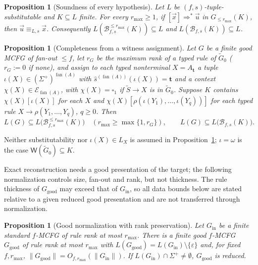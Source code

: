 \documentclass[11pt]{article}
\numberwithin{equation}{section}
\theoremstyle{plain}
\newtheorem{proposition}[theorem]{Proposition}
\theoremstyle{definition}
\theoremstyle{remark}
\newcommand{\Wit}{\mathsf{W}}
\newcommand{\tuple}[1]{\vec{#1}}
\newcommand{\blank}{\square}
\newcommand{\eps}{\varepsilon}
\newcommand{\fan}{\operatorname{fan}}
\theoremstyle{plain}
\begin{document}
\begin{proposition}[Soundness of every hypothesis]
\label{prop:reconstruction-soundness}
Let $L$ be $(f,s)$-tuple-substitutable and $K\subseteq L$ finite.  For every
$r_{\max}\ge1$, if $[\tuple x]\Rightarrow^*\tuple u$ in
$\widehat G_{\le r_{\max}}(K)$, then $\tuple u\equiv_{L,s}\tuple x$.
Consequently $L(\mathcal B_{f,s}^{\le r_{\max}}(K))\subseteq L$ and
$L(\mathcal B_{f,s}(K))\subseteq L$.
\end{proposition}

\begin{proposition}[Completeness from a witness assignment]
\label{prop:completeness}
Let $G$ be a finite good MCFG of fan-out $\le f$, let $r_G$ be the maximum
rank of a typed rule of $\widetilde G_0$ ($r_G:=0$ if none), and assign to
each typed nonterminal $X=A_{\mathbf t}$ a tuple
$\iota(X)\in(\Sigma^+)^{\fan(A)}$ with $\widehat s^{(\fan(A))}(\iota(X))=\mathbf t$
and a context $\chi(X)\in\mathcal E_{\fan(A)}$, with $\chi(X)=\blank_1$ if
$\widetilde S\to X$ is in $\widetilde G_0$.  Suppose $K$ contains
$\chi(X)[\iota(X)]$ for each $X$ and
$\chi(X)[\rho(\iota(Y_1),\ldots,\iota(Y_q))]$ for each
typed rule $X\to\rho(Y_1,\ldots,Y_q)$, $q\ge0$.  Then
\[
 L(G)\subseteq L\bigl(\mathcal B_{f,s}^{\le r_{\max}}(K)\bigr)
 \quad(r_{\max}\ge\max\{1,r_G\}),\qquad
 L(G)\subseteq L\bigl(\mathcal B_{f,s}(K)\bigr).
\]
\end{proposition}

Neither substitutability nor $\iota(X)\in L_X$ is assumed in
Proposition~\ref{prop:completeness}; $\iota=\omega$ is the case
$\Wit(\widetilde G_0)\subseteq K$.

Exact reconstruction needs a good presentation of the target; the following
normalization controls size, fan-out and rank, but not thickness.  The rule
thickness of $G_{\mathrm{good}}$ may exceed that of $G_{\mathrm{in}}$, so all
data bounds below are stated relative to a given reduced good presentation and
are not transferred through normalization.

\begin{proposition}[Good normalization with rank preservation]
\label{prop:good-normalization}
Let $G_{\mathrm{in}}$ be a finite standard $f$-MCFG of rule rank at most
$r_{\max}$.  There is a finite good $f$-MCFG $G_{\mathrm{good}}$ of rule rank at
most $r_{\max}$ with $L(G_{\mathrm{good}})=L(G_{\mathrm{in}})\setminus\{\eps\}$
and, for fixed $f,r_{\max}$,
$\|G_{\mathrm{good}}\|=O_{f,r_{\max}}(\|G_{\mathrm{in}}\|)$.  If
$L(G_{\mathrm{in}})\cap\Sigma^+\ne\emptyset$, $G_{\mathrm{good}}$ is reduced.
\end{proposition}
\end{document}
